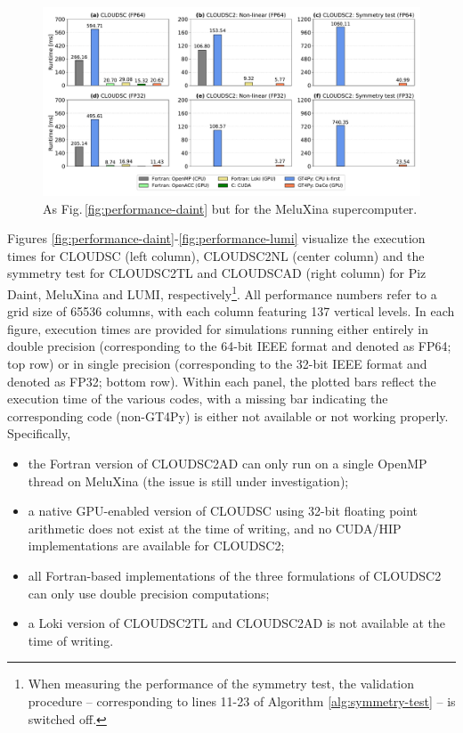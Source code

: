 \documentclass[gmd,manuscript,online]{copernicus}
\theoremstyle{theorem}
\theoremstyle{definition}
\theoremstyle{remark}
\theoremstyle{proposition}
\begin{document}
	\begin{figure}[t!]
		\centering
		\includegraphics[scale=0.44]{performance_mlux_2.pdf}
		\caption{As Fig.\,\ref{fig:performance-daint} but for the MeluXina supercomputer.}
		\label{fig:performance-mlux}
	\end{figure}

	Figures \ref{fig:performance-daint}-\ref{fig:performance-lumi} visualize the execution times for CLOUDSC (left column), CLOUDSC2NL  (center column) and the symmetry test for CLOUDSC2TL and CLOUDSCAD (right column) for Piz Daint, MeluXina and LUMI, respectively\footnote{When measuring the performance of the symmetry test, the validation procedure -- corresponding to lines 11-23 of Algorithm \ref{alg:symmetry-test} -- is switched off.}. All performance numbers refer to a grid size of 65536 columns, with each column featuring 137 vertical levels. In each figure, execution times are provided for simulations running either entirely in double precision (corresponding to the 64-bit IEEE format and denoted as FP64; top row) or in single precision (corresponding to the 32-bit IEEE format and denoted as FP32; bottom row). Within each panel, the plotted bars reflect the execution time of the various codes, with a missing bar indicating the corresponding code (non-GT4Py) is either not available or not working properly. Specifically,
	\begin{itemize}
		\item the Fortran version of CLOUDSC2AD can only run on a single OpenMP thread on MeluXina (the issue is still under investigation);
		\item a native GPU-enabled version of CLOUDSC using 32-bit floating point arithmetic does not exist at the time of writing, and no CUDA/HIP implementations are available for CLOUDSC2;
		\item all Fortran-based implementations of the three formulations of CLOUDSC2 can only use double precision computations;
		\item a Loki version of CLOUDSC2TL and CLOUDSC2AD is not available at the time of writing.
	\end{itemize}
\end{document}
